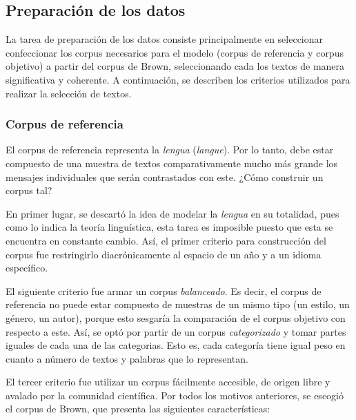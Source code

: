 \documentclass[12pt,letterpaper,twoside]{article}
\begin{document}
\subsection{Preparación de los datos}
\label{sec:org1a607bd}
\label{sec:preparacion_datos} La tarea de preparación de los datos
consiste principalmente en seleccionar confeccionar los corpus
necesarios para el modelo (corpus de referencia y corpus objetivo)
a partir del corpus de Brown, seleccionando cada los textos de
manera significativa y coherente.  A continuación, se describen los
criterios utilizados para realizar la selección de textos.

\subsubsection{Corpus de referencia}
\label{sec:org9bc262b}

El corpus de referencia representa la \emph{lengua} (\emph{langue}). Por lo
tanto, debe estar compuesto de una muestra de textos
comparativamente mucho más grande los mensajes individuales que
serán contrastados con este. ¿Cómo construir un corpus tal?

En primer lugar, se descartó la idea de modelar la \emph{lengua} en su
totalidad, pues como lo indica la teoría linguística, esta tarea
es imposible puesto que esta se encuentra en constante
cambio. Así, el primer criterio para construcción del corpus fue
restringirlo diacrónicamente al espacio de un año y a un idioma
específico.

El siguiente criterio fue armar un corpus \emph{balanceado}. Es decir,
el corpus de referencia no puede estar compuesto de muestras de
un mismo tipo (un estilo, un género, un autor), porque esto
sesgaría la comparación de el corpus objetivo con respecto a
este. Así, se optó por partir de un corpus \emph{categorizado} y tomar
partes iguales de cada una de las categorias. Esto es, cada
categoría tiene igual peso en cuanto a número de textos y
palabras que lo representan.

El tercer criterio fue utilizar un corpus fácilmente accesible,
de origen libre y avalado por la comunidad científica. Por todos
los motivos anteriores, se escogió el corpus de Brown, que
presenta las siguientes características:
\end{document}
